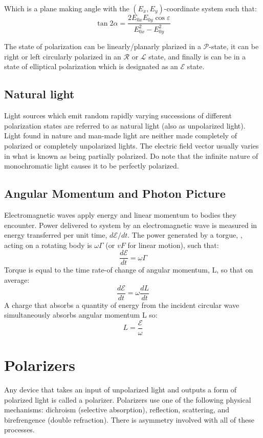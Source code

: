 \documentclass[12pt]{report}
\begin{document}
Which is a plane making angle \textalpha with the $(E_x,E_y)$-coordinate system such that:
\begin{equation}
\tan 2\alpha = \frac{2E_{0x}E_{0y}\cos \varepsilon}{E_{0x}^2 - E_{0y}^2}
\end{equation}

The state of polarization can be linearly/planarly plarized in a $\mathcal{P}$-state, it can be right or left circularly polarized in an $\mathcal{R}$ or $\mathcal{L}$ state, and finally is can be in a state of elliptical polarization which is designated as an $\mathcal{E}$ state. 

\subsection{Natural light}
Light sources which emit random rapidly varying successions of different polarization states are referred to as natural light (also as unpolarized light). Light found in nature and man-made light are neither made completely of polarized or completely unpolarized lights. The electric field vector usually varies in what is known as being partially polarized. Do note that the infinite nature of monochromatic light causes it to be perfectly polarized.

\subsection{Angular Momentum and Photon Picture} 
Electromagnetic waves apply energy and linear momentum to bodies they encounter. Power delivered to system by an electromagnetic wave is measured in energy transferred per unit time, $d\mathcal{E}/dt$. The power generated by a torgue, \textGamma, acting on a rotating body is $\omega\Gamma$ (or $vF$ for linear motion), such that:
\[\frac{d\mathcal{E}}{dt}=\omega\Gamma\]
Torque is equal to the time rate-of change of angular momentum, L, so that on average:
\[\frac{d\mathcal{E}}{dt}=\omega\frac{dL}{dt}\]
A charge that absorbs a quantity of energy from the incident circular wave simultaneously absorbs angular momentum L so:
\[L=\frac{\mathcal{E}}{\omega}\]


\section{Polarizers}
Any device that takes an input of unpolarized light and outputs a form of polarized light is called a polarizer. Polarizers use one of the following physical mechanisms: dichroism (selective absorption), reflection, scattering, and birefrengence (double refraction). There is asymmetry involved with all of these processes. 
\end{document}
